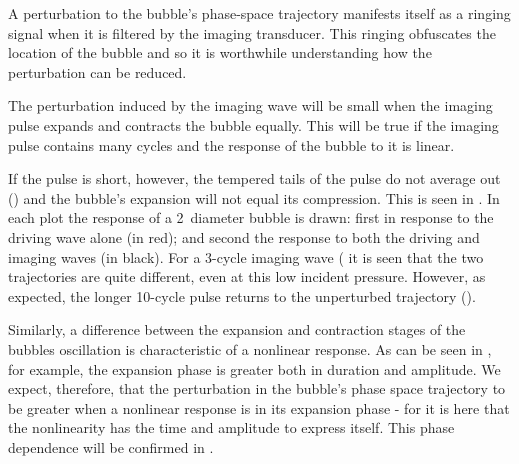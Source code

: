 A perturbation to the bubble's phase-space trajectory 
manifests itself as a ringing signal when it is filtered by the imaging transducer.
This ringing obfuscates the location of the bubble and so 
it is worthwhile understanding how the perturbation can be reduced.


The perturbation induced by the imaging wave will be small 
when the imaging pulse expands and contracts the bubble equally.
This will be true if the imaging pulse contains many cycles and the response of the bubble to it is linear.

If the pulse is short, however, the tempered tails of the pulse do not average out ()
and the bubble's expansion will not equal its compression.
This is seen in .
In each plot the response of a \unit{2}\micro\metre\ diameter bubble is drawn:
first in response to the driving wave alone (in red);
and second the response to both the driving and imaging waves (in black).
For a 3-cycle imaging wave ( %
it is seen that the two trajectories are quite different, even at this low incident pressure.
However, as expected, the longer  10-cycle pulse returns to the unperturbed trajectory 
().




Similarly, 
a difference between the expansion and contraction stages of the bubbles oscillation
is characteristic of a nonlinear response.
As can be seen in , for example,
the expansion phase is greater both in duration and amplitude.
We  expect, therefore, that the perturbation in  the bubble's phase space trajectory  to be greater 
when a nonlinear response is in its  expansion phase - 
for it is here that the nonlinearity has the time and amplitude to express itself.
This phase dependence will be  confirmed in .



